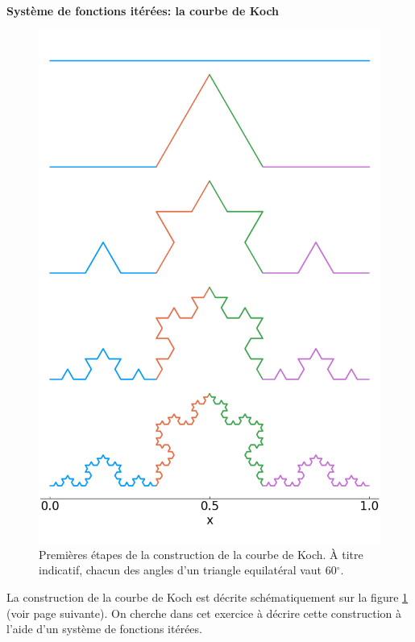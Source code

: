 \documentclass[12pt]{exam}
\begin{document}
\begin{questions}

\question[10] \textbf{Système de fonctions itérées: la courbe de Koch}
  \noaddpoints

  \begin{figure}
    \centering
    \includegraphics[height=.6\textheight]{imgs/koch_curve.png}
    \caption{Premières étapes de la construction de la courbe de Koch. \`A titre indicatif, chacun des angles d'un triangle equilatéral vaut 60$^\circ$.}
    \label{fig: koch curve}
  \end{figure}

  La construction de la courbe de Koch est décrite schématiquement sur la figure \ref{fig: koch curve} (voir page suivante). On cherche dans cet exercice à décrire cette construction à l'aide d'un système de fonctions itérées.


\end{questions}
\end{document}
